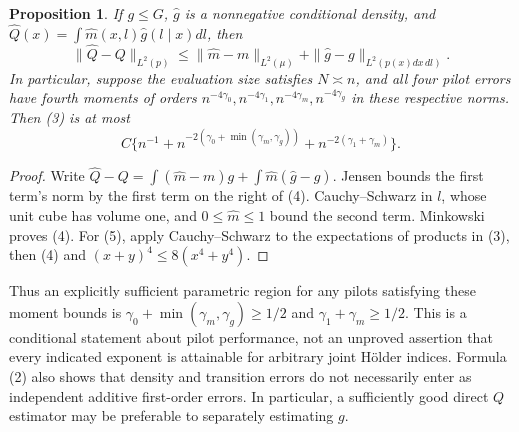 \documentclass[11pt]{article}
\newtheorem{proposition}[theorem]{Proposition}
\theoremstyle{definition}
\begin{document}
\begin{proposition}
If $g\le G$, $\widehat g$ is a nonnegative conditional density, and
$\widehat Q(x)=\int\widehat m(x,l)\widehat g(l\mid x)dl$, then
\[
 \|\widehat Q-Q\|_{L^2(p)}
 \le \|\widehat m-m\|_{L^2(\mu)}
       +\|\widehat g-g\|_{L^2(p(x)dx\,dl)}.              \tag{4}
\]
In particular, suppose the evaluation size satisfies $N\asymp n$, and
all four pilot errors have fourth moments of orders
$n^{-4\gamma_0},n^{-4\gamma_1},n^{-4\gamma_m},n^{-4\gamma_g}$ in these respective norms.
Then (3) is at most
\[
 C\{n^{-1}+n^{-2(\gamma_0+\min(\gamma_m,\gamma_g))}
             +n^{-2(\gamma_1+\gamma_m)}\}.                        \tag{5}
\]
\end{proposition}
\begin{proof}
Write $\widehat Q-Q=\int(\widehat m-m)g+
\int\widehat m(\widehat g-g)$. Jensen bounds the first term's norm by
the first term on the right of (4). Cauchy--Schwarz in $l$, whose unit
cube has volume one, and $0\le\widehat m\le1$ bound the second term.
Minkowski proves (4). For (5), apply Cauchy--Schwarz to the expectations
of products in (3), then (4) and $(x+y)^4\le8(x^4+y^4)$.
\end{proof}
Thus an explicitly sufficient parametric region for any pilots satisfying
these moment bounds is $\gamma_0+\min(\gamma_m,\gamma_g)\ge1/2$ and
$\gamma_1+\gamma_m\ge1/2$. This is a conditional statement about pilot performance,
not an unproved assertion that every indicated exponent is attainable
for arbitrary joint H\"older indices. Formula (2) also shows that density
and transition errors do not necessarily enter as independent additive
first-order errors. In particular, a sufficiently good direct $Q$ estimator
may be preferable to separately estimating $g$.
\end{document}
